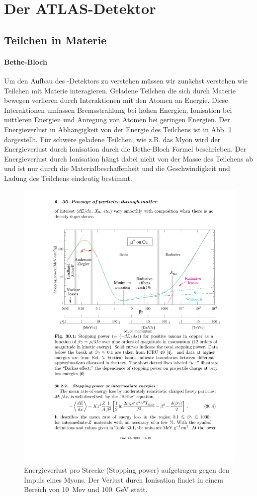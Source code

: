 \section{Der ATLAS-Detektor}
\subsection{Teilchen in Materie}
\paragraph{Bethe-Bloch}
Um den Aufbau des \atlas-Detektors zu verstehen müssen wir zunächst verstehen wie Teilchen mit Materie interagieren. Geladene Teilchen die sich durch Materie bewegen verlieren durch Interaktionen mit den Atomen an Energie. Diese Interaktionen umfassen Bremsstrahlung bei hohen Energien, Ionisation bei mittleren Energien und Anregung von Atomen bei geringen Energien. Der Energieverlust in Abhängigkeit von der Energie des Teilchens ist in Abb. \ref{fig:bethe} dargestellt. Für schwere geladene Teilchen, wie z.B. das Myon wird der Energieverlust durch Ionisation durch die Bethe-Bloch Formel beschrieben\cite{Passage_through_matter}. Der Energieverlust durch Ionisation hängt dabei nicht von der Masse des Teilchens ab und ist nur durch die Materialbeschaffenheit und die Geschwindigkeit und Ladung des Teilchens eindeutig bestimmt. 
\begin{figure}
\centering
\includegraphics[scale=0.7]{./input/bethe.pdf}\caption{Energieverlust pro Strecke (Stopping power) aufgetragen gegen den Impuls eines Myons. Der Verlust durch Ionisation findet in einem Bereich von 10~Mev und 100~GeV statt\cite{Passage_through_matter}.}\label{fig:bethe}
\end{figure}
